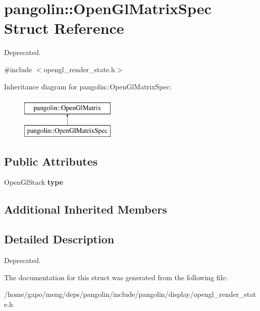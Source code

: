 \hypertarget{structpangolin_1_1_open_gl_matrix_spec}{}\section{pangolin\+:\+:Open\+Gl\+Matrix\+Spec Struct Reference}
\label{structpangolin_1_1_open_gl_matrix_spec}


Deprecated.  




{\ttfamily \#include $<$opengl\+\_\+render\+\_\+state.\+h$>$}

Inheritance diagram for pangolin\+:\+:Open\+Gl\+Matrix\+Spec\+:\begin{figure}[H]
\begin{center}
\leavevmode
\includegraphics[height=2.000000cm]{structpangolin_1_1_open_gl_matrix_spec}
\end{center}
\end{figure}
\subsection*{Public Attributes}
\begin{DoxyCompactItemize}
\item 
Open\+Gl\+Stack {\bfseries type}\hypertarget{structpangolin_1_1_open_gl_matrix_spec_a1154276433df8ca2d6a4838c12af00f9}{}\label{structpangolin_1_1_open_gl_matrix_spec_a1154276433df8ca2d6a4838c12af00f9}

\end{DoxyCompactItemize}
\subsection*{Additional Inherited Members}


\subsection{Detailed Description}
Deprecated. 

The documentation for this struct was generated from the following file\+:\begin{DoxyCompactItemize}
\item 
/home/gapo/meng/deps/pangolin/include/pangolin/display/opengl\+\_\+render\+\_\+state.\+h\end{DoxyCompactItemize}

